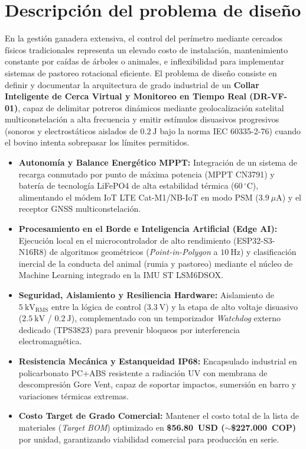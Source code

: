 \section*{Descripción del problema de diseño}
En la gestión ganadera extensiva, el control del perímetro mediante cercados físicos tradicionales representa un elevado costo de instalación, mantenimiento constante por caídas de árboles o animales, e inflexibilidad para implementar sistemas de pastoreo rotacional eficiente. El problema de diseño consiste en definir y documentar la arquitectura de grado industrial de un \textbf{Collar Inteligente de Cerca Virtual y Monitoreo en Tiempo Real (DR-VF-01)}, capaz de delimitar potreros dinámicos mediante geolocalización satelital multiconstelación a alta frecuencia y emitir estímulos disuasivos progresivos (sonoros y electrostáticos aislados de $0.2~\text{J}$ bajo la norma IEC 60335-2-76) cuando el bovino intenta sobrepasar los límites permitidos.

\begin{itemize}[leftmargin=*, label=$\blacksquare$]
    \item \textbf{Autonomía y Balance Energético MPPT:} Integración de un sistema de recarga conmutado por punto de máxima potencia (MPPT CN3791) y batería de tecnología LiFePO4 de alta estabilidad térmica ($60\,^\circ\text{C}$), alimentando el módem IoT LTE Cat-M1/NB-IoT en modo PSM ($3.9~\mu\text{A}$) y el receptor GNSS multiconstelación.
    \item \textbf{Procesamiento en el Borde e Inteligencia Artificial (Edge AI):} Ejecución local en el microcontrolador de alto rendimiento (ESP32-S3-N16R8) de algoritmos geométricos (\textit{Point-in-Polygon} a $10~\text{Hz}$) y clasificación inercial de la conducta del animal (rumia y pastoreo) mediante el núcleo de Machine Learning integrado en la IMU ST LSM6DSOX.
    \item \textbf{Seguridad, Aislamiento y Resiliencia Hardware:} Aislamiento de $5~\text{kV}_{\text{RMS}}$ entre la lógica de control ($3.3~\text{V}$) y la etapa de alto voltaje disuasivo ($2.5~\text{kV}$ / $0.2~\text{J}$), complementado con un temporizador \textit{Watchdog} externo dedicado (TPS3823) para prevenir bloqueos por interferencia electromagnética.
    \item \textbf{Resistencia Mecánica y Estanqueidad IP68:} Encapsulado industrial en policarbonato PC+ABS resistente a radiación UV con membrana de descompresión Gore Vent, capaz de soportar impactos, sumersión en barro y variaciones térmicas extremas.
    \item \textbf{Costo Target de Grado Comercial:} Mantener el costo total de la lista de materiales (\textit{Target BOM}) optimizado en \textbf{\$56.80~USD ($\sim$\$227.000~COP)} por unidad, garantizando viabilidad comercial para producción en serie.
\end{itemize}

